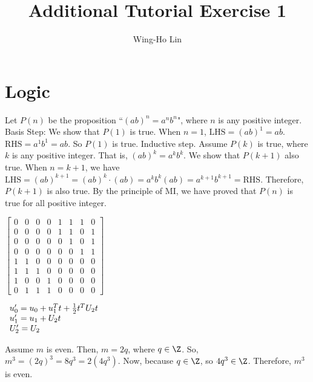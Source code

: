 \documentclass[11pt, oneside]{article}
\title{Additional Tutorial Exercise 1}
\author{Wing-Ho Lin}
\date{}
\begin{document}
\maketitle 

\section{Logic}

Let $P(n)$ be the proposition ``$(ab)^n=a^nb^n$", where $n$ is any positive integer.\newline
Basis Step: We show that $P(1)$ is true. When $n=1$, $\text{LHS}=(ab)^1=ab$. $\text{RHS}=a^1b^1=ab$. So $P(1)$ is true.\newline
Inductive step. Assume $P(k)$ is true, where $k$ is any positive integer. That is, $(ab)^k=a^kb^k$. We show that $P(k+1)$ also true. When $n=k+1$, we have $\text{LHS}=(ab)^{k+1}=(ab)^k\cdot(ab)=a^kb^k(ab)=a^{k+1}b^{k+1}=\text{RHS}$. Therefore, $P(k+1)$ is also true. By the principle of MI, we have proved that $P(n)$ is true for all positive integer.


$
\begin{bmatrix}
	0 & 0 & 0 & 0  & 1 & 1 & 1 & 0 \\
	0 & 0 & 0 & 0  & 1 & 1 & 0 & 1 \\
	0 & 0 & 0 & 0  & 0 & 1 & 0 & 1 \\
	0 & 0 & 0 & 0  & 0 & 0 & 1 & 1 \\
	1 & 1 & 0 & 0  & 0 & 0 & 0 & 0 \\
	1 & 1 & 1 & 0  & 0 & 0 & 0 & 0 \\
	1 & 0 & 0 & 1  & 0 & 0 & 0 & 0 \\
	0 & 1 & 1 & 1  & 0 & 0 & 0 & 0 
\end{bmatrix}
$

$
\begin{array}{l}
u'_0 = {u_0} + u_1^Tt + {\textstyle{1 \over 2}}{t^T}{U_2}t\\
{u'_1} = {u_1} + {U_2}t\\
{U'_2} = {U_2}
\end{array} 
$


Assume $m$ is even. Then, $m=2q$, where $q\in\Z$. So, $m^3=(2q)^3=8q^3=2(4q^3).$ Now, because $q\in\Z$, so $4q^3\in\Z$. Therefore, $m^3$ is even.
\end{document}
